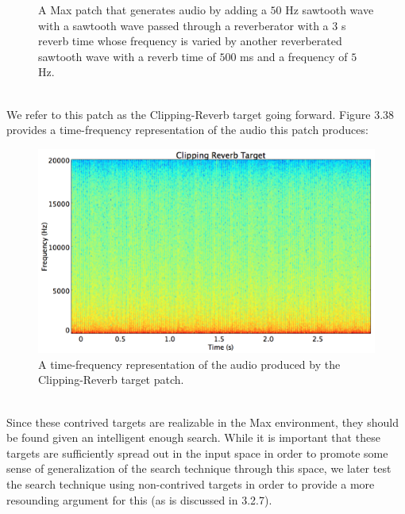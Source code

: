\documentclass[a4paper,12pt]{report} 	%
\numberwithin{figure}{chapter}
\numberwithin{table}{chapter}
\numberwithin{equation}{chapter}
\begin{document}
\begin{flushleft}
\begin{figure}[h!]
\begin{center}
\caption[Clipping Reverb Sawtooth Max Patch]{A Max patch that generates audio by adding a $50$ Hz sawtooth wave with a sawtooth wave passed through a reverberator with a $3$ s reverb time whose frequency is varied by another reverberated sawtooth wave with a reverb time of $500$ ms and a frequency of $5$ Hz.}
\end{center}
\end{figure}
\\
We refer to this patch as the Clipping-Reverb target going forward. Figure 3.38 provides a time-frequency representation of the audio this patch produces:
\begin{figure}[h!]
\begin{center}
\includegraphics[scale=0.35,width=\linewidth]{ClippingReverbTargetSTFT}
\caption[Clipping Reverb Sawtooth Time-Frequency Representation]{A time-frequency representation of the audio produced by the Clipping-Reverb target patch.}
\end{center}
\end{figure}
\\
Since these contrived targets are realizable in the Max environment, they should be found given an intelligent enough search. While it is important that these targets are sufficiently spread out in the input space in order to promote some sense of generalization of the search technique through this space, we later test the search technique using non-contrived targets in order to provide a more resounding argument for this (as is discussed in 3.2.7).


\end{flushleft}
\end{document}
